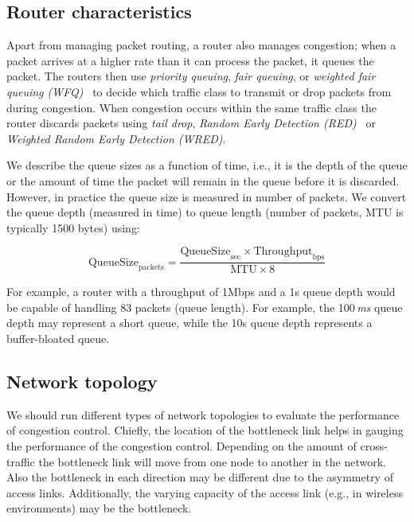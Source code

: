 \subsection*{Router characteristics}


Apart from managing packet routing, a router also manages congestion; when a
packet arrives at a higher rate than it can process the packet, it queues the
packet. The routers then use \emph{priority queuing}, \emph{fair queuing}, or
\emph{weighted fair queuing (WFQ)}~\cite{rfc4594} to decide which traffic
class to transmit or drop packets from during congestion. When congestion
occurs within the same traffic class the router discards packets using
\emph{tail drop}, \emph{Random Early Detection (RED)}~\cite{Floyd:RED} or
\emph{Weighted Random Early Detection (WRED)}.

We describe the queue sizes as a function of time, i.e., it is the depth of
the queue or the amount of time the packet will remain in the queue before it
is discarded. However, in practice the queue size is measured in number of
packets. We convert the queue depth (measured in time) to queue length (number
of packets, MTU is typically 1500 bytes) using:

\begin{equation*}
  \mathrm{QueueSize}_\mathrm{packets} = 
    \frac{\mathrm{QueueSize}_\mathrm{sec} \times
    \mathrm{Throughput}_\mathrm{bps}}{\mathrm{MTU} \times \mathrm{8}}
\end{equation*}

For example, a router with a throughput of 1Mbps and a 1s queue depth would be
capable of handling 83 packets (queue length). For example, the 100\,\emph{ms}
queue depth may represent a short queue, while the 10s queue depth represents
a buffer-bloated queue.

\subsection*{Network topology}

We should run different types of network topologies to evaluate the
performance of congestion control. Chiefly, the location of the bottleneck
link helps in gauging the performance of the congestion control. Depending on
the amount of cross-traffic the bottleneck link will move from one node to
another in the network. Also the bottleneck in each direction may be different
due to the asymmetry of access links. Additionally, the varying capacity of
the access link (e.g., in wireless environments) may be the bottleneck.

